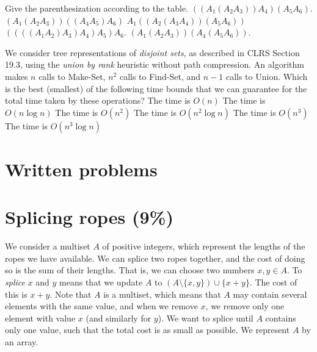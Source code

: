 \medskip\noindent
Give the parenthesization according to the table.
\oneanswer
%
\optionsstart
\answer $((A_1( A_2A_3))A_4)(A_5A_6)$.\correct
\answer $(A_1(A_2 A_3))((A_4 A_5)A_6)$
\answer $A_1((A_2(A_3A_4))(A_5 A_6))$
\answer $((((A_1 A_2)A_3)A_4)A_5)A_6$.
\answer $(A_1(A_2 A_3))(A_4(A_5 A_6))$.
\optionsend
{}


We consider tree representations of \emph{disjoint sets}, as described in CLRS Section 19.3, using the \emph{union by rank} heuristic without path compression.
An algorithm makes $n$ calls to {\sc Make-Set}, $n^2$ calls to {\sc Find-Set}, and $n-1$ calls to {\sc Union}.
Which is the best (smallest) of the following time bounds that we can guarantee for the total time taken by these operations?
\oneanswer
\optionsstart
\answer The time is $O(n)$
\answer The time is $O(n \log n)$
\answer The time is $O(n^2)$
\answer The time is $O(n^2 \log n)$ \correct
\answer The time is $O(n^3)$
\answer The time is $O(n^3 \log n)$
\optionsend
{}


\multiplechoiceend

\newpage

\section*{Written problems}\label{sec:written}




\section{Splicing ropes (9\%)}

We consider a multiset $A$ of positive integers, which represent the lengths of the ropes we have available.
We can splice two ropes together, and the cost of doing so is the sum of their lengths.
That is, we can choose two numbers $x,y\in A$.
To \emph{splice} $x$ and $y$ means that we update $A$ to $(A\setminus\{x,y\})\cup\{x+y\}$.
The cost of this is $x+y$.
Note that $A$ is a multiset, which means that $A$ may contain several elements with the same value, and when we remove $x$, we remove only one element with value $x$ (and similarly for $y$).
We want to splice until $A$ contains only one value, such that the total cost is as small as possible.
We represent $A$ by an array.

